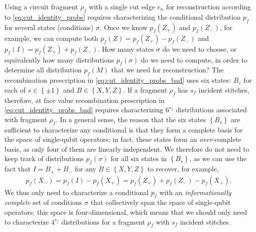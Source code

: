 \documentclass[nofootinbib,notitlepage,11pt]{revtex4-2}
\newcommand{\p}[1]{\left(#1\right)} %
\renewcommand{\set}[1]{\left\{#1\right\}} %
\begin{document}
Using a circuit fragment $\rho_f$ with a single cut edge $e_n$ for
reconstruction according to \eqref{eq:cut_identity_probs} requires
characterizing the conditional distribution $p_f$ for several states
(conditions) $\sigma$.  Once we know $p_f\p{Z_+}$ and $p_f\p{Z_-}$,
for example, we can compute both $p_f\p{Z}=p_f\p{Z_+}-p_f\p{Z_-}$ and
$p_f\p{I}=p_f\p{Z_+}+p_f\p{Z_-}$.  How many states $\sigma$ do we need
to choose, or equivalently how many distributions $p_f\p{\sigma}$ do
we need to compute, in order to determine all distribution $p_f\p{M}$
that we need for reconstruction?  The recombination prescription in
\eqref{eq:cut_identity_probs_bad} uses six states: $B_s$ for each of
$s\in\set{\pm1}$ and $B\in\set{X,Y,Z}$.  If a fragment $\rho_f$ has
$s_f$ incident stitches, therefore, at face value recombination
prescription in \eqref{eq:cut_identity_probs_bad} requires
characterizing $6^{s_f}$ distributions associated with fragment
$\rho_f$.  In a general sense, the reason that the six states
$\set{B_s}$ are sufficient to characterize any conditional is that
they form a complete basis for the space of single-qubit operators; in
fact, these states form an {\it over}-complete basis, as only four of
them are linearly independent.  We therefore do not need to keep track
of distributions $p_f\p{\sigma}$ for all six states in $\set{B_s}$, as
we can use the fact that $I=B_++B_-$ for any $B\in\set{X,Y,Z}$ to
recover, for example,
\begin{align}
  p_f\p{X_-}
  = p_f\p{I} - p_f\p{X_+}
  = p_f\p{Z_+} + p_f\p{Z_-} - p_f\p{X_+}.
  \label{eq:X-_expansion}
\end{align}
We thus only need to characterize a conditional $p_f$ with an {\it
  informationally complete} set of conditions $\sigma$ that
collectively span the space of single-qubit operators; this space is
four-dimensional, which means that we should only need to characterize
$4^{s_f}$ distributions for a fragment $\rho_f$ with $s_f$ incident
stitches.
\end{document}
